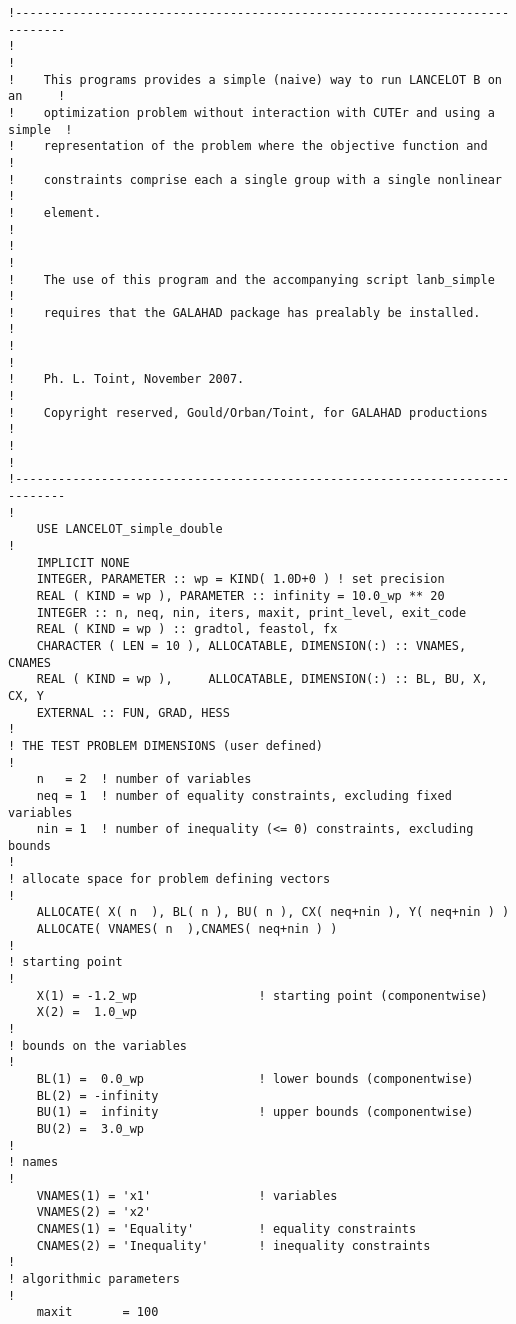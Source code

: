 \documentclass{article}
\begin{document}
\begin{lstlisting}
!-----------------------------------------------------------------------------
!                                                                            !
!    This programs provides a simple (naive) way to run LANCELOT B on an     !
!    optimization problem without interaction with CUTEr and using a simple  !
!    representation of the problem where the objective function and          !
!    constraints comprise each a single group with a single nonlinear        !
!    element.                                                                !
!                                                                            !
!    The use of this program and the accompanying script lanb_simple         !
!    requires that the GALAHAD package has prealably be installed.           !
!                                                                            !
!    Ph. L. Toint, November 2007.                                            !
!    Copyright reserved, Gould/Orban/Toint, for GALAHAD productions          !
!                                                                            !
!-----------------------------------------------------------------------------
!
    USE LANCELOT_simple_double
!
    IMPLICIT NONE
    INTEGER, PARAMETER :: wp = KIND( 1.0D+0 ) ! set precision
    REAL ( KIND = wp ), PARAMETER :: infinity = 10.0_wp ** 20
    INTEGER :: n, neq, nin, iters, maxit, print_level, exit_code
    REAL ( KIND = wp ) :: gradtol, feastol, fx
    CHARACTER ( LEN = 10 ), ALLOCATABLE, DIMENSION(:) :: VNAMES, CNAMES
    REAL ( KIND = wp ),     ALLOCATABLE, DIMENSION(:) :: BL, BU, X, CX, Y
    EXTERNAL :: FUN, GRAD, HESS
!
! THE TEST PROBLEM DIMENSIONS (user defined)
!
    n   = 2  ! number of variables
    neq = 1  ! number of equality constraints, excluding fixed variables
    nin = 1  ! number of inequality (<= 0) constraints, excluding bounds
!
! allocate space for problem defining vectors
!
    ALLOCATE( X( n  ), BL( n ), BU( n ), CX( neq+nin ), Y( neq+nin ) )
    ALLOCATE( VNAMES( n  ),CNAMES( neq+nin ) )
!
! starting point
!
    X(1) = -1.2_wp                 ! starting point (componentwise)
    X(2) =  1.0_wp
!
! bounds on the variables
!
    BL(1) =  0.0_wp                ! lower bounds (componentwise)
    BL(2) = -infinity
    BU(1) =  infinity              ! upper bounds (componentwise)
    BU(2) =  3.0_wp
!
! names
!
    VNAMES(1) = 'x1'               ! variables
    VNAMES(2) = 'x2'
    CNAMES(1) = 'Equality'         ! equality constraints
    CNAMES(2) = 'Inequality'       ! inequality constraints
!
! algorithmic parameters
!
    maxit       = 100

\end{lstlisting}
\end{document}

